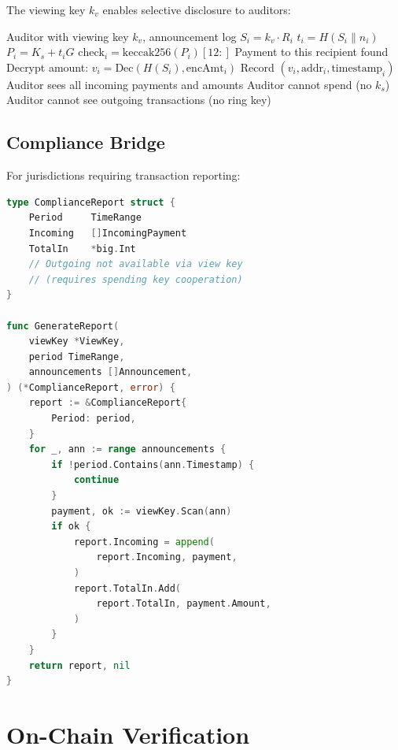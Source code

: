 \documentclass[11pt,a4paper]{article}
\begin{document}
The viewing key $k_v$ enables selective disclosure to auditors:

\begin{algorithm}[H]
\caption{View Key Audit}
\label{alg:audit}
\begin{algorithmic}[1]
\Require Auditor with viewing key $k_v$, announcement log
    \State $S_i = k_v \cdot R_i$
    \State $t_i = H(S_i \| n_i)$
    \State $P_i = K_s + t_i G$
    \State $\mathrm{check}_i = \mathrm{keccak256}(P_i)[12:]$
        \State Payment to this recipient found
        \State Decrypt amount: $v_i = \mathrm{Dec}(H(S_i), \mathrm{encAmt}_i)$
        \State Record $(v_i, \mathrm{addr}_i, \mathrm{timestamp}_i)$
    \EndIf
\EndFor
\State Auditor sees all incoming payments and amounts
\State Auditor cannot spend (no $k_s$)
\State Auditor cannot see outgoing transactions (no ring key)
\end{algorithmic}
\end{algorithm}

\subsection{Compliance Bridge}

For jurisdictions requiring transaction reporting:

\begin{lstlisting}[language=Go,caption={Compliance View Key}]
type ComplianceReport struct {
    Period     TimeRange
    Incoming   []IncomingPayment
    TotalIn    *big.Int
    // Outgoing not available via view key
    // (requires spending key cooperation)
}

func GenerateReport(
    viewKey *ViewKey,
    period TimeRange,
    announcements []Announcement,
) (*ComplianceReport, error) {
    report := &ComplianceReport{
        Period: period,
    }
    for _, ann := range announcements {
        if !period.Contains(ann.Timestamp) {
            continue
        }
        payment, ok := viewKey.Scan(ann)
        if ok {
            report.Incoming = append(
                report.Incoming, payment,
            )
            report.TotalIn.Add(
                report.TotalIn, payment.Amount,
            )
        }
    }
    return report, nil
}
\end{lstlisting}

\section{On-Chain Verification}
\label{sec:verification}
\end{document}

